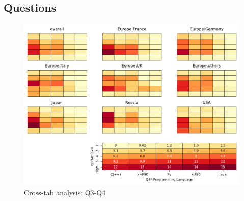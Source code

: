 
\subsection{Questions}


\begin{figure}
\begin{center}
\includegraphics[width=12cm]{../pdfs/Q3-Q4.pdf}
\caption{Cross-tab analysis: Q3-Q4}
\label{fig:Q3-Q4}
\end{center}
\end{figure}
